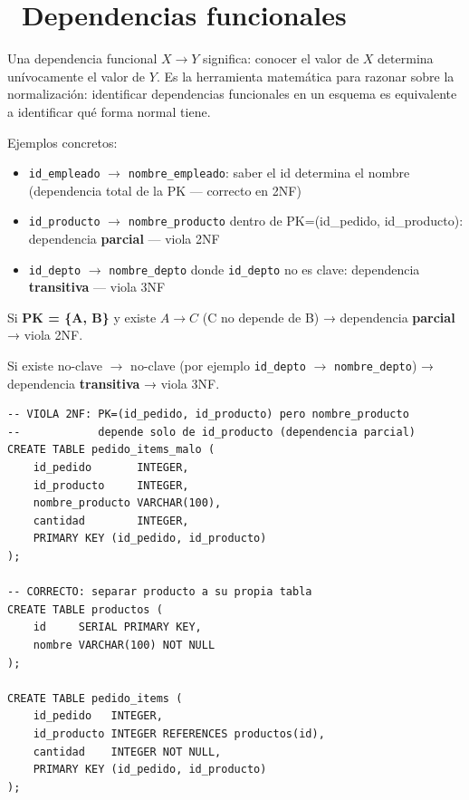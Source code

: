 \section[Dependencias funcionales]{~Dependencias funcionales}

Una dependencia funcional $X \rightarrow Y$ significa: conocer el valor de $X$ determina unívocamente el valor de $Y$.
Es la herramienta matemática para razonar sobre la normalización: identificar dependencias funcionales en un esquema es equivalente a identificar qué forma normal tiene.

Ejemplos concretos:
\begin{itemize}
  \item \texttt{id\_empleado} $\rightarrow$ \texttt{nombre\_empleado}: saber el id determina el nombre (dependencia total de la PK — correcto en 2NF)
  \item \texttt{id\_producto} $\rightarrow$ \texttt{nombre\_producto} dentro de PK=(id\_pedido, id\_producto): dependencia \textbf{parcial} — viola 2NF
  \item \texttt{id\_depto} $\rightarrow$ \texttt{nombre\_depto} donde \texttt{id\_depto} no es clave: dependencia \textbf{transitiva} — viola 3NF
\end{itemize}

Si \textbf{PK = \{A, B\}} y existe $A \rightarrow C$ (C no depende de B) → dependencia \textbf{parcial} → viola 2NF.

Si existe no-clave $\rightarrow$ no-clave (por ejemplo \texttt{id\_depto} $\rightarrow$ \texttt{nombre\_depto}) → dependencia \textbf{transitiva} → viola 3NF.

\begin{lstlisting}[caption={Tabla que viola 2NF y su corrección}]
-- VIOLA 2NF: PK=(id_pedido, id_producto) pero nombre_producto
--            depende solo de id_producto (dependencia parcial)
CREATE TABLE pedido_items_malo (
    id_pedido       INTEGER,
    id_producto     INTEGER,
    nombre_producto VARCHAR(100),
    cantidad        INTEGER,
    PRIMARY KEY (id_pedido, id_producto)
);

-- CORRECTO: separar producto a su propia tabla
CREATE TABLE productos (
    id     SERIAL PRIMARY KEY,
    nombre VARCHAR(100) NOT NULL
);

CREATE TABLE pedido_items (
    id_pedido   INTEGER,
    id_producto INTEGER REFERENCES productos(id),
    cantidad    INTEGER NOT NULL,
    PRIMARY KEY (id_pedido, id_producto)
);
\end{lstlisting}

